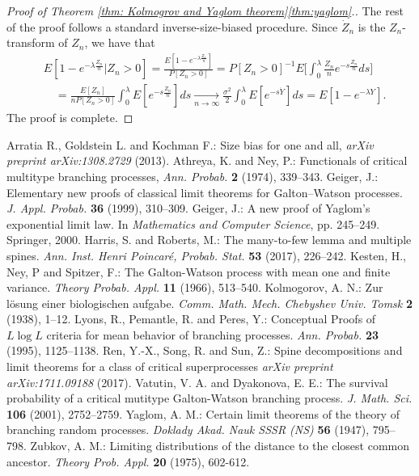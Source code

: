 \documentclass[12pt,a4paper]{amsart}
\numberwithin{equation}{section}
\begin{document}
\begin{proof}[Proof of Theorem \ref{thm: Kolmogrov and Yaglom theorem}\eqref{thm:yaglom}.]
	The rest of the proof follows a standard inverse-size-biased procedure. 
	Since $\dot Z_n$ is the $Z_n$-transform of $Z_n$, we have that
	\[\begin{split}
	&E[1-e^{-\lambda \frac{Z_n}{n}} | Z_n > 0] 
	= \frac{E[1- e^{-\lambda \frac{Z_n}{n}}]}{P[Z_n > 0]} 
	= P[Z_n > 0]^{-1} E \Big[\int_0^\lambda \frac{Z_n}{n}e^{- s \frac{Z_n}{n}} ds\Big]
	\\&\quad = \frac{E[Z_n]}{nP[Z_n > 0]}\int_0^\lambda E [e^{- s \frac{\dot Z_n}{n}}] ds
	\xrightarrow[n\to \infty]{} \frac{\sigma^2}{2} \int_0^\lambda E[e^{-s \dot Y}]ds
	= E[1-e^{-\lambda Y}].
	\end{split}\]
	The proof is complete.
\end{proof}
\vspace{.1in}
\begin{thebibliography}{99}
	Arratia R., Goldstein L. and Kochman F.:
	Size bias for one and all,
	{\it arXiv preprint arXiv:1308.2729}
	(2013).
	Athreya, K.  and  Ney, P.: 
	Functionals of critical multitype branching processes, 
	{\it Ann. Probab.} 
	{\bf 2} (1974), 339--343.
	Geiger, J.:
	Elementary new proofs of classical limit theorems for Galton--Watson processes.
	{\it J. Appl. Probab.} 
	\textbf{36} (1999), 310--309.
	Geiger, J.:
	A new proof of Yaglom's exponential limit law.
	In {\it Mathematics and Computer Science}, 
	pp. 245--249. Springer, 2000.
	Harris, S. and Roberts, M.:
	The many-to-few lemma and multiple spines.
	{\it Ann.  Inst. Henri Poincar{\'e}, Probab. Stat.}
	\textbf{53} (2017), 226--242.
	Kesten, H.,  Ney, P and Spitzer, F.:
	The Galton-Watson process with mean one and finite variance.
	{\it Theory Probab. Appl.}
	\textbf{11} (1966), 513--540.
	Kolmogorov, A. N.:
	Zur l{\"o}sung einer biologischen aufgabe.
	{\it Comm. Math. Mech. Chebyshev Univ. Tomsk}
	\textbf{2} (1938), 1--12.
	Lyons, R.,  Pemantle, R. and Peres, Y.:
	Conceptual Proofs of $ L \log L $ criteria for mean behavior of branching processes.
	{\it Ann. Probab.} \textbf{23} (1995), 1125--1138.
	Ren, Y.-X., Song, R. and Sun, Z.:
	Spine decompositions and limit theorems for a class of critical superprocesses
	{\it arXiv preprint arXiv:1711.09188}
	(2017).
	Vatutin, V. A. and Dyakonova,  E. E.: 
	The survival probability of a critical mutitype Galton-Watson branching process. 
	{\it J.  Math. Sci.} 
	\textbf{106} (2001), 2752--2759.
	Yaglom, A. M.:
	Certain limit theorems of the theory of branching random processes.
	{\it Doklady Akad. Nauk SSSR (NS)} 
	\textbf{56} (1947), 795--798.
	Zubkov, A. M.:
	Limiting distributions of the distance to the closest common ancestor. 
	{\it Theory Prob. Appl.}
	\textbf{20} (1975), 602-612.

\end{thebibliography}
\end{document}
